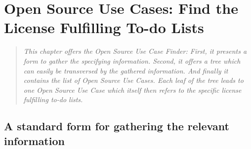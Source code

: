 %
%
%
%
%



\chapter{Open Source Use Cases: Find the License Fulfilling To-do Lists}\label{sec:OSUCfinder}

\footnotesize
\begin{quote}\itshape
This chapter offers the \emph{Open Source Use Case Finder}: First, it presents
a form to gather the specifying information. Second, it offers a tree which
can easily be transversed by the gathered information. And finally it contains
the list of \emph{Open Source Use Cases}. Each leaf of the tree leads to one
\emph{Open Source Use Case} which itself then refers to the specific license
fulfilling to-do lists.
\end{quote}
\normalsize{}

\section{A standard form for gathering the relevant information}
\label{OSLiCStandardFormForGatheringInformation}
 
